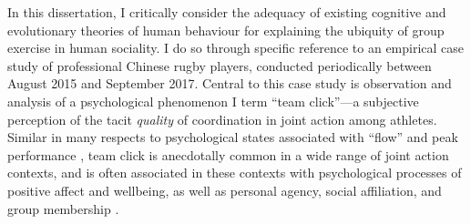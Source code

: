 In this dissertation, I critically consider the adequacy of existing cognitive and evolutionary theories of human behaviour for explaining the ubiquity of group exercise in human sociality.  I do so through specific reference to an empirical case study of professional Chinese rugby players, conducted periodically between August 2015 and September 2017. Central to this case study is observation and analysis of a psychological phenomenon I term ``team click''---a subjective perception  of the tacit \textit{quality} of coordination in joint action among athletes.  Similar in many respects to psychological states associated with ``flow'' and peak performance \citep{Csikszentmihalyi1992}, team click is anecdotally common in a wide range of joint action contexts, and is often associated in these contexts with psychological processes of positive affect and wellbeing, as well as personal agency, social affiliation, and group membership \citep{Marsh2009, Wheatley2012}.


